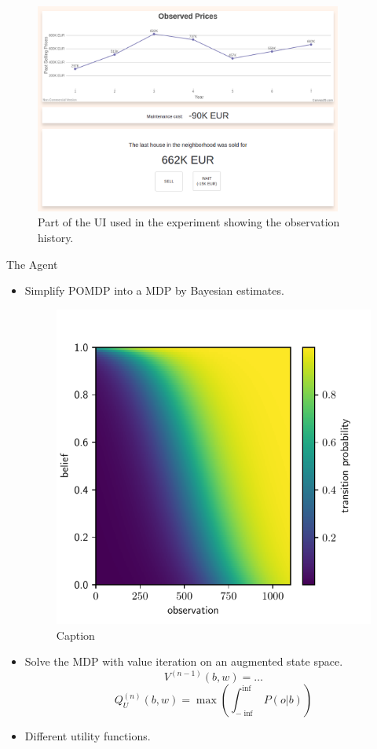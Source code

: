 \begin{figure}
  \centering
    \includegraphics[width=0.9\textwidth]{img/methods/experiment_obs_1.png}
  \caption{Part of the UI used in the experiment showing the observation history.}
\end{figure}


\Large{The Agent}
\normalsize
\begin{itemize}
    \item Simplify POMDP into a MDP by Bayesian estimates.
    \begin{figure}
        \centering
        \includegraphics{img/belief_table.pdf}
        \caption{Caption}
        \label{fig:my_label}
    \end{figure}
    \item Solve the MDP with value iteration on an augmented state space.
    \[V^{(n-1)}(b,w) =\ldots\]
    \[Q^{(n)}_{U} (b, w) = \max(\int_{-\inf}^{\inf}{P(o|b)}) \]
    \item Different utility functions.
\end{itemize}
